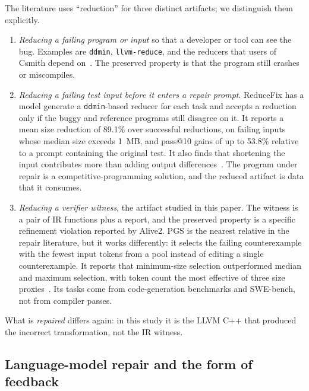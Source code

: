 \documentclass[conference]{IEEEtran}
\begin{document}
The literature uses ``reduction'' for three distinct artifacts; we distinguish them explicitly.
\begin{enumerate}
\item \emph{Reducing a failing program or input} so that a developer or tool can see the bug. Examples are \texttt{ddmin}, \texttt{llvm-reduce}, and the reducers that users of Csmith depend on~\cite{zeller2002dd,yang2011csmith,llvmreducedoc}. The preserved property is that the program still crashes or miscompiles.
\item \emph{Reducing a failing test input before it enters a repair prompt}. ReduceFix has a model generate a \texttt{ddmin}-based reducer for each task and accepts a reduction only if the buggy and reference programs still disagree on it. It reports a mean size reduction of 89.1\% over successful reductions, on failing inputs whose median size exceeds 1~MB, and pass@10 gains of up to 53.8\% relative to a prompt containing the original test. It also finds that shortening the input contributes more than adding output differences~\cite{yang2026reducefix}. The program under repair is a competitive-programming solution, and the reduced artifact is data that it consumes.
\item \emph{Reducing a verifier witness}, the artifact studied in this paper. The witness is a pair of IR functions plus a report, and the preserved property is a specific refinement violation reported by Alive2. PGS is the nearest relative in the repair literature, but it works differently: it selects the failing counterexample with the fewest input tokens from a pool instead of editing a single counterexample. It reports that minimum-size selection outperformed median and maximum selection, with token count the most effective of three size proxies~\cite{he2026pgs}. Its tasks come from code-generation benchmarks and SWE-bench, not from compiler passes.
\end{enumerate}
What is \emph{repaired} differs again: in this study it is the LLVM C++ that produced the incorrect transformation, not the IR witness.

\subsection{Language-model repair and the form of feedback}
\end{document}
